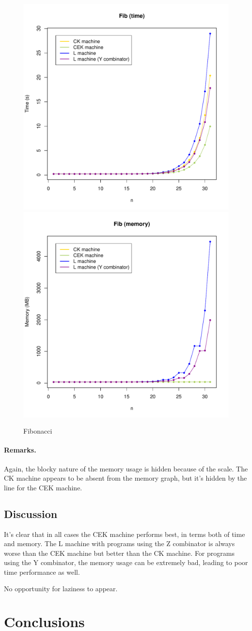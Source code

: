\documentclass[a4paper]{article}
\begin{document}
\newpage
\begin{figure}[H]
\centering
\includegraphics[width=0.7\linewidth]{figs/fib-times.pdf}
\includegraphics[width=0.7\linewidth]{figs/fib-mem.pdf}
\caption{Fibonacci}\label{fig:fib-graphs}
\end{figure}

\paragraph{Remarks.}  Again, the blocky nature of the memory usage is hidden because
of the scale.  The CK machine appears to be absent from the memory
graph, but it's hidden by the line for the CEK machine.
\newpage

\subsection*{Discussion} It's clear that in all cases the CEK machine performs best, 
in terms both of time and memory.  The L machine with programs using
the Z combinator is always worse than the CEK machine but better than
the CK machine.  For programs using the Y combinator, the memory usage
can be extremely bad,  leading to poor time performance as well.


No opportunity for laziness to appear.

\section{Conclusions}



\end{document}
